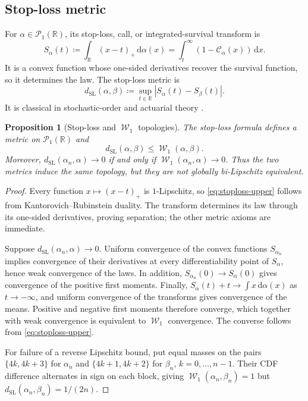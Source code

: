 \documentclass[11pt]{article}
\newtheorem{proposition}[theorem]{Proposition}
\newcommand{\RR}{\mathbb R}
\newcommand{\Pp}{\mathcal P}
\renewcommand{\d}{\,\mathrm d}
\newcommand{\al}{\alpha}
\newcommand{\be}{\beta}
\newcommand{\Cc}{\mathcal C}
\newcommand{\cumul}[1]{\Cc_{#1}}
\DeclareMathOperator{\Wass}{\mathcal W}
\newcommand{\eqdef}{\coloneqq}
\begin{document}
\subsection{Stop-loss metric}

For $\al\in\Pp_1(\RR)$, its stop-loss, call, or integrated-survival
transform is
\begin{equation}\label{eq:stoploss-transform}
 S_\al(t)\eqdef\int_\RR(x-t)_+\d\al(x)
 =\int_t^\infty(1-\cumul{\al}(x))\d x.
\end{equation}
It is a convex function whose one-sided derivatives recover the survival
function, so it determines the law.  The stop-loss metric is
\begin{equation}\label{eq:stoploss-metric}
 d_{\mathrm{SL}}(\al,\be)
 \eqdef\sup_{t\in\RR}|S_\al(t)-S_\be(t)|.
\end{equation}
It is classical in stochastic-order and actuarial theory
\cite{MullerStoyan2002,DenuitEtAl2005}.

\begin{proposition}[Stop-loss and $\Wass_1$ topologies]
\label{prop:stoploss-w1}
The stop-loss formula defines a metric on $\Pp_1(\RR)$ and
\begin{equation}\label{eq:stoploss-upper}
 d_{\mathrm{SL}}(\al,\be)\leq\Wass_1(\al,\be).
\end{equation}
Moreover, $d_{\mathrm{SL}}(\al_n,\al)\to0$ if and only if
$\Wass_1(\al_n,\al)\to0$.  Thus the two metrics induce the same topology,
but they are not globally bi-Lipschitz equivalent.
\end{proposition}

\begin{proof}
Every function $x\mapsto(x-t)_+$ is $1$-Lipschitz, so
\eqref{eq:stoploss-upper} follows from Kantorovich--Rubinstein duality.
The transform determines its law through its one-sided derivatives, proving
separation; the other metric axioms are immediate.

Suppose $d_{\mathrm{SL}}(\al_n,\al)\to0$.  Uniform convergence of the
convex functions $S_{\al_n}$ implies convergence of their derivatives at
every differentiability point of $S_\al$, hence weak convergence of the
laws.  In addition, $S_{\al_n}(0)\to S_\al(0)$ gives convergence of the
positive first moments.  Finally,
$S_\al(t)+t\to\int x\d\al(x)$ as $t\to-\infty$, and uniform convergence
of the transforms gives convergence of the means.  Positive and negative
first moments therefore converge, which together with weak convergence is
equivalent to $\Wass_1$ convergence.  The converse follows from
\eqref{eq:stoploss-upper}.

For failure of a reverse Lipschitz bound, put equal masses on the pairs
$\{4k,4k+3\}$ for $\al_n$ and $\{4k+1,4k+2\}$ for $\be_n$,
$k=0,\ldots,n-1$.  Their CDF difference alternates in sign on each block,
giving $\Wass_1(\al_n,\be_n)=1$ but
$d_{\mathrm{SL}}(\al_n,\be_n)=1/(2n)$.
\end{proof}
\end{document}
